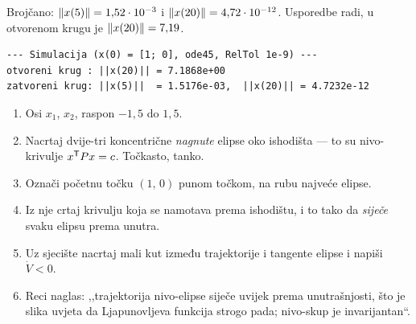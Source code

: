 Brojčano: $\left\lVert x(5) \right\rVert = 1{,}52 \cdot 10^{-3}$ i
$\left\lVert x(20) \right\rVert = 4{,}72 \cdot 10^{-12}$. Usporedbe radi, u otvorenom krugu je
$\left\lVert x(20) \right\rVert = 7{,}19$.

\begin{lstlisting}[style=outputstyle]
--- Simulacija (x(0) = [1; 0], ode45, RelTol 1e-9) ---
otvoreni krug : ||x(20)|| = 7.1868e+00
zatvoreni krug: ||x(5)||  = 1.5176e-03,  ||x(20)|| = 4.7232e-12
\end{lstlisting}

\begin{ploca}
\begin{enumerate}[leftmargin=*]
  \item Osi $x_1$, $x_2$, raspon $-1{,}5$ do $1{,}5$.
  \item Nacrtaj dvije-tri koncentrične \emph{nagnute} elipse oko ishodišta ---
        to su nivo-krivulje $x^{\mathsf{T}} P x = c$. Točkasto, tanko.
  \item Označi početnu točku $(1,\,0)$ punom točkom, na rubu najveće elipse.
  \item Iz nje crtaj krivulju koja se namotava prema ishodištu, i to tako da
        \emph{siječe} svaku elipsu prema unutra.
  \item Uz sjecište nacrtaj mali kut između trajektorije i tangente elipse i
        napiši $\dot{V} < 0$.
  \item Reci naglas: ,,trajektorija nivo-elipse siječe uvijek prema unutrašnjosti,
        što je slika uvjeta da Ljapunovljeva funkcija strogo pada; nivo-skup je
        invarijantan``.
\end{enumerate}
\end{ploca}

